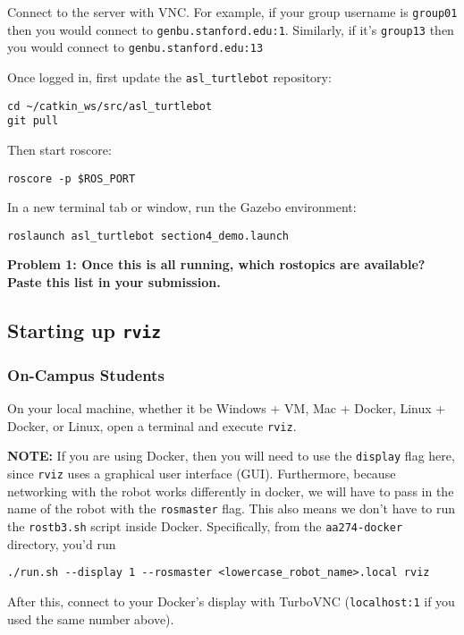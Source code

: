 \documentclass{article}
\begin{document}
Connect to the server with VNC. For example, if your group username is \texttt{group01} then you would connect to \texttt{genbu.stanford.edu:1}. Similarly, if it's \texttt{group13} then you would connect to \texttt{genbu.stanford.edu:13}

Once logged in, first update the \texttt{asl\_turtlebot} repository:
\begin{lstlisting}
cd ~/catkin_ws/src/asl_turtlebot
git pull
\end{lstlisting}

Then start roscore:
\begin{lstlisting}
roscore -p $ROS_PORT
\end{lstlisting}

In a new terminal tab or window, run the Gazebo environment:
\begin{lstlisting}
roslaunch asl_turtlebot section4_demo.launch
\end{lstlisting}

{\bf Problem 1: Once this is all running, which rostopics are available? Paste this list in your submission.}

\subsection{Starting up \texttt{rviz}}

\subsubsection{On-Campus Students}

On your local machine, whether it be Windows + VM, Mac + Docker, Linux + Docker, or Linux, open a terminal and execute \texttt{rviz}.

{\bf NOTE:} If you are using Docker, then you will need to use the \texttt{display} flag here, since \texttt{rviz} uses a graphical user interface (GUI). Furthermore, because networking with the robot works differently in docker, we will have to pass in the name of the robot with the \texttt{rosmaster} flag. This also means we don't have to run the \texttt{rostb3.sh} script inside Docker. Specifically, from the \texttt{aa274-docker} directory, you'd run 
\begin{lstlisting}
./run.sh --display 1 --rosmaster <lowercase_robot_name>.local rviz
\end{lstlisting}
After this, connect to your Docker's display with TurboVNC (\texttt{localhost:1} if you used the same number above).
\end{document}
